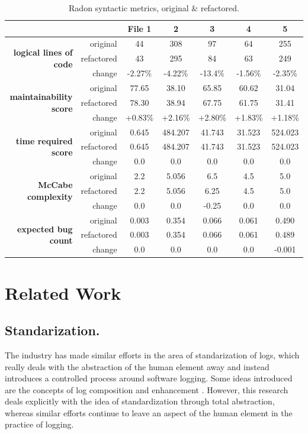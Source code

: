 \documentclass[acmsmall,review,authorversion]{acmart}
\begin{document}
\begin{table}[h]
\centering
\begin{tabular}{|r|r|c|c|c|c|c|}
\hline
 &  & \textbf{File 1} & \textbf{2} & \textbf{3} & \textbf{4} & \textbf{5} \\ \hline
\multirow{3}{*}{\textbf{logical lines of code}} & original & 44 & 308 & 97 & 64 & 255 \\ \cline{2-7}
 & refactored & 43 & 295 & 84 & 63 & 249 \\ \cline{2-7}
 & change & -2.27\% & -4.22\% & -13.4\% & -1.56\% & -2.35\% \\ \hline
\multirow{3}{*}{\textbf{maintainability score}} & original & 77.65 & 38.10 & 65.85 & 60.62 & 31.04 \\ \cline{2-7}
 & refactored & 78.30 & 38.94 & 67.75 & 61.75 & 31.41 \\ \cline{2-7}
 & change & +0.83\% & +2.16\% & +2.80\% & +1.83\% & +1.18\% \\ \hline
\multirow{3}{*}{\textbf{time required score}} & original & 0.645 & 484.207 & 41.743 & 31.523 & 524.023 \\ \cline{2-7}
 & refactored & 0.645 & 484.207 & 41.743 & 31.523 & 524.023 \\ \cline{2-7}
 & change & 0.0 & 0.0 & 0.0 & 0.0 & 0.0 \\ \hline
\multirow{3}{*}{\textbf{McCabe complexity}} & original & 2.2 & 5.056 & 6.5 & 4.5 & 5.0 \\ \cline{2-7}
 & refactored & 2.2 & 5.056 & 6.25 & 4.5 & 5.0 \\ \cline{2-7}
 & change & 0.0 & 0.0 & -0.25 & 0.0 & 0.0 \\ \hline
\multirow{3}{*}{\textbf{expected bug count}} & original & 0.003 & 0.354 & 0.066 & 0.061 & 0.490 \\ \cline{2-7}
 & refactored & 0.003 & 0.354 & 0.066 & 0.061 & 0.489 \\ \cline{2-7}
 & change & 0.0 & 0.0 & 0.0 & 0.0 & -0.001 \\ \hline
\end{tabular}
\caption{Radon syntactic metrics, original \& refactored.}
\label{tab:evaluation-metrics}
\end{table}

\section{Related Work}

    \subsection{Standarization.} The industry has made similar efforts in the area of standarization of logs, which really deals with the abstraction of the human element away and instead introduces a controlled process around software logging. Some ideas introduced are the concepts of log composition \cite{DBLP:conf/dls/Marron18} and enhancement \cite{DBLP:journals/tocs/YuanZPZS12}. However, this research deals explicitly with the idea of standardization through total abstraction, whereas similar efforts continue to leave an aspect of the human element in the practice of logging.
\end{document}
